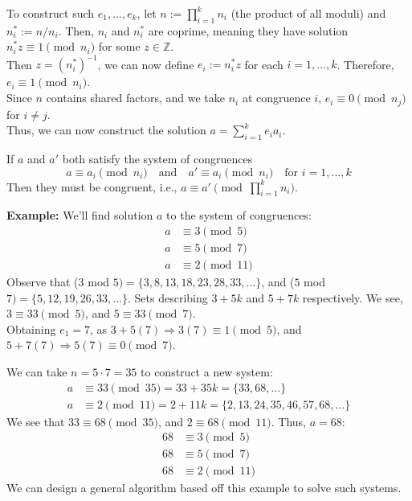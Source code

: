 \newpage

\begin{Proof}

\noindent
To construct such $e_1,...,e_k$, let $n := \prod_{i=1}^k n_i$ (the product of all moduli) and $n_i^* := n/n_i$. Then, $n_i$ and $n_i^*$ are coprime, meaning they have solution $n_i^*z\equiv 1\pmod{n_i}$ for some $z\in\mathbb{Z}$.\\

\noindent
Then $z=(n_i^*)^{-1}$, we can now define $e_i := n_i^*z$ for each $i=1,...,k$. Therefore, $e_i\equiv 1\pmod{n_i}$.\\
Since $n$ contains shared factors, and we take $n_i$ at congruence $i$, $e_i\equiv 0\pmod{n_j}$ for $i\neq j$.\\

\noindent
Thus, we can now construct the solution $a = \sum_{i=1}^k e_ia_i$.

\end{Proof}
\begin{Proof}

    If \( a \) and \( a' \) both satisfy the system of congruences
    \[
    a \equiv a_i \pmod{n_i} \quad \text{and} \quad a' \equiv a_i \pmod{n_i} \quad \text{for } i = 1, \dots, k
    \]
    Then they must be congruent, i.e., \( a \equiv a' \pmod{\prod_{i=1}^k n_i} \).\\
    
    \noindent
\end{Proof}
\textbf{Example:} We'll find solution $a$ to the system of congruences:
\begin{align*}
    a &\equiv 3 \pmod{5} \\
    a &\equiv 5 \pmod{7} \\
    a &\equiv 2 \pmod{11}
\end{align*}
Observe that ($3$ mod $5)=\{3,8,13,18,23,28,33,...\}$, and ($5$ mod $7)=\{5,12,19,26,33,...\}$.
Sets describing $3+5k$ and $5+7k$ respectively. We see,  $3\equiv 33\pmod{5}$, and $5\equiv 33\pmod{7}$.\\

\noindent
Obtaining $e_1=7$, as $3+5(7)\Longrightarrow3(7)\equiv 1\pmod{5}$, and $5+7(7)\Longrightarrow5(7)\equiv0\pmod{7}$. 

\noindent
We can take $n=5\cdot7=35$ to construct a new system:
\begin{align*}
    a &\equiv 33 \pmod{35} = 33+35k = \{33,68,...\} \\
    a &\equiv 2 \pmod{11} = 2+11k = \{2,13,24,35,46,57,68,...\}
\end{align*}
We see that $33\equiv 68\pmod{35}$, and $2\equiv 68\pmod{11}$. Thus, $a=68$:
\begin{align*}
    68 &\equiv 3 \pmod{5} \\
    68 &\equiv 5 \pmod{7} \\
    68 &\equiv 2 \pmod{11}
\end{align*}
We can design a general algorithm based off this example to solve such systems.

